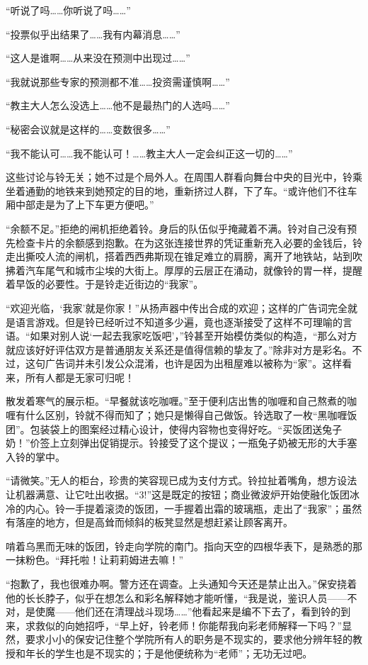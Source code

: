 “听说了吗……你听说了吗……”

“投票似乎出结果了……我有内幕消息……”

“这人是谁啊……从来没在预测中出现过……”

“我就说那些专家的预测都不准……投资需谨慎啊……”

“教主大人怎么没选上……他不是最热门的人选吗……”

“秘密会议就是这样的……变数很多……”

“我不能认可……我不能认可！……教主大人一定会纠正这一切的……”

这些讨论与铃无关；她不过是个局外人。在周围人群看向舞台中央的目光中，铃乘坐着通勤的地铁来到她预定的目的地，重新挤过人群，下了车。“或许他们不往车厢中部走是为了上下车更方便吧。”

“余额不足。”拒绝的闸机拒绝着铃。身后的队伍似乎掩藏着不满。铃对自己没有预先检查卡片的余额感到抱歉。在为这张连接世界的凭证重新充入必要的金钱后，铃走出撕咬人流的闸机，搭着西西弗斯现在锥足难立的肩膀，离开了地铁站，站到吹拂着汽车尾气和城市尘埃的大街上。厚厚的云层正在涌动，就像铃的胃一样，提醒着早饭的必要性。于是铃走近街边的“我家”。

“欢迎光临，‘我家’就是你家！”从扬声器中传出合成的欢迎；这样的广告词完全就是语言游戏。但是铃已经听过不知道多少遍，竟也逐渐接受了这样不可理喻的言语。“如果对别人说‘一起去我家吃饭吧’，”铃甚至开始模仿类似的构造，“那么对方就应该好好评估双方是普通朋友关系还是值得信赖的挚友了。”除非对方是彩名。不过，这句广告词并未引发公众混淆，也许是因为出租屋难以被称为“家”。这样看来，所有人都是无家可归呢！

散发着寒气的展示柜。“早餐就该吃咖喱。”至于便利店出售的咖喱和自己熬煮的咖喱有什么区别，铃就不得而知了；她只是懒得自己做饭。铃选取了一枚“黑咖喱饭团”。包装袋上的图案经过精心设计，使得内容物也变得好吃。“买饭团送兔子奶！”价签上立刻弹出促销提示。铃接受了这个提议；一瓶兔子奶被无形的大手塞入铃的掌中。

“请微笑。”无人的柜台，珍贵的笑容现已成为支付方式。铃拉扯着嘴角，想方设法让机器满意、让它吐出收据。“3!”这是既定的按钮；商业微波炉开始使融化饭团冰冷的内心。铃一手提着滚烫的饭团，一手握着出霜的玻璃瓶，走出了“我家”；虽然有落座的地方，但是高耸而倾斜的板凳显然是想赶紧让顾客离开。

啃着乌黑而无味的饭团，铃走向学院的南门。指向天空的四根华表下，是熟悉的那一抹粉色。“拜托啦！让莉莉姆进去嘛！”

“抱歉了，我也很难办啊。警方还在调查。上头通知今天还是禁止出入。”保安挠着他的长长脖子，似乎在想怎么和彩名解释她才能听懂，“我是说，鉴识人员——不对，是使魔——他们还在清理战斗现场……”他看起来是编不下去了，看到铃的到来，求救似的向她招呼，“早上好，铃老师！你能帮我向彩老师解释一下吗？”显然，要求小小的保安记住整个学院所有人的职务是不现实的，要求他分辨年轻的教授和年长的学生也是不现实的；于是他便统称为“老师”；无功无过吧。

